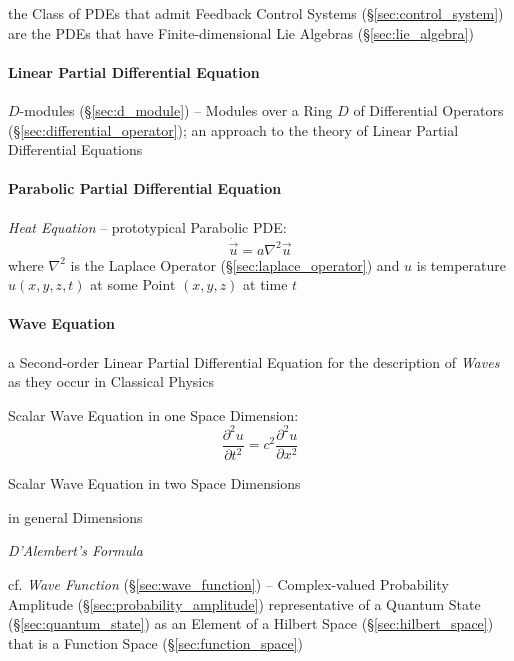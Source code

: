 the Class of PDEs that admit Feedback Control Systems
(\S\ref{sec:control_system}) are the PDEs that have Finite-dimensional Lie
Algebras (\S\ref{sec:lie_algebra})



\paragraph{Linear Partial Differential Equation}\label{sec:linear_pde}\hfill

\fist $D$-modules (\S\ref{sec:d_module}) -- Modules over a Ring $D$ of
Differential Operators (\S\ref{sec:differential_operator}); an approach to the
theory of Linear Partial Differential Equations



\paragraph{Parabolic Partial Differential Equation}
\label{sec:parabolic_pde}\hfill

\emph{Heat Equation} -- prototypical Parabolic PDE:
\[
  \dot{\vec{u}} = a \nabla^2 \vec{u}
\]
where $\nabla^2$ is the Laplace Operator (\S\ref{sec:laplace_operator}) and $u$
is temperature $u(x,y,z,t)$ at some Point $(x,y,z)$ at time $t$



\paragraph{Wave Equation}\label{sec:wave_equation}\hfill

a Second-order Linear Partial Differential Equation for the description of
\emph{Waves} as they occur in Classical Physics

Scalar Wave Equation in one Space Dimension:
\[
  \frac{\partial^2 u}{\partial{t}^2} = c^2 \frac{\partial^2 u}{\partial{x}^2}
\]

Scalar Wave Equation in two Space Dimensions

in general Dimensions

\emph{D'Alembert's Formula}

cf. \emph{Wave Function} (\S\ref{sec:wave_function}) -- Complex-valued
Probability Amplitude (\S\ref{sec:probability_amplitude}) representative of a
Quantum State (\S\ref{sec:quantum_state}) as an Element of a Hilbert Space
(\S\ref{sec:hilbert_space}) that is a Function Space
(\S\ref{sec:function_space})



